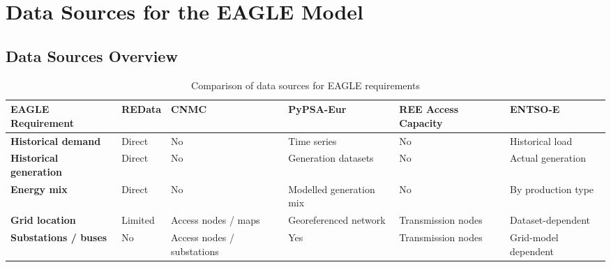
\chapter{Data Sources for the EAGLE Model}

\section{Data Sources Overview}

\begin{table}[htbp]
\centering
\caption{Comparison of data sources for EAGLE requirements}
\label{tab:eagle_data_sources}
\renewcommand{\arraystretch}{1.25}
\setlength{\tabcolsep}{2.5pt}

\begin{adjustbox}{max width=\textwidth}
\begin{tabular}{
>{\raggedright\arraybackslash}p{4.0cm}
>{\raggedright\arraybackslash}p{2.8cm}
>{\raggedright\arraybackslash}p{2.8cm}
>{\raggedright\arraybackslash}p{3.6cm}
>{\raggedright\arraybackslash}p{3.2cm}
>{\raggedright\arraybackslash}p{3.2cm}}
\hline

\textbf{EAGLE Requirement} &
\textbf{REData} &
\textbf{CNMC} &
\textbf{PyPSA-Eur} &
\textbf{REE Access Capacity} &
\textbf{ENTSO-E} \\

\hline

\textbf{Historical demand} &
\cellcolor{green!25} Direct &
\cellcolor{red!25} No &
\cellcolor{green!25} Time series &
\cellcolor{red!25} No &
\cellcolor{green!25} Historical load \\

\textbf{Historical generation} &
\cellcolor{green!25} Direct &
\cellcolor{red!25} No &
\cellcolor{orange!25} Generation datasets &
\cellcolor{red!25} No &
\cellcolor{green!25} Actual generation \\

\textbf{Energy mix} &
\cellcolor{green!25} Direct &
\cellcolor{red!25} No &
\cellcolor{orange!25} Modelled generation mix &
\cellcolor{red!25} No &
\cellcolor{green!25} By production type \\

\textbf{Grid location} &
\cellcolor{orange!25} Limited &
\cellcolor{orange!25} Access nodes / maps &
\cellcolor{green!25} Georeferenced network &
\cellcolor{green!25} Transmission nodes &
\cellcolor{orange!25} Dataset-dependent \\

\textbf{Substations / buses} &
\cellcolor{red!25} No &
\cellcolor{orange!25} Access nodes / substations &
\cellcolor{green!25} Yes &
\cellcolor{green!25} Transmission nodes &
\cellcolor{orange!25} Grid-model dependent \\


\end{tabular}
\end{adjustbox}
\end{table}
